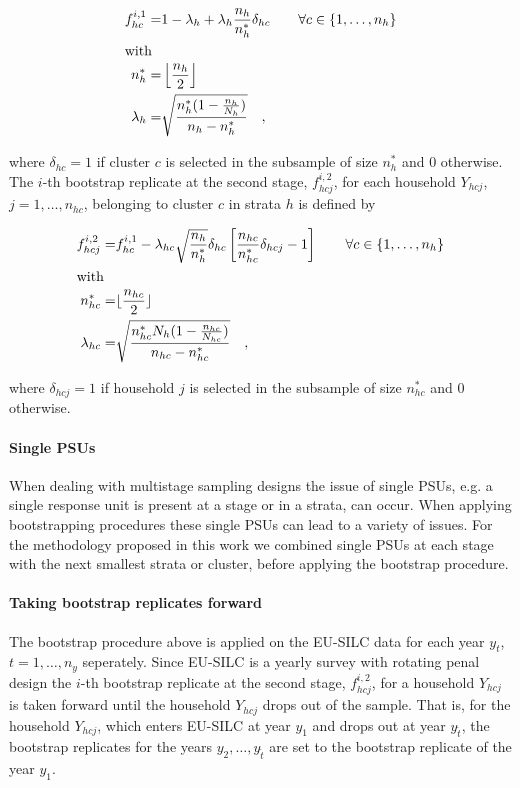 \documentclass{scrartcl}\usepackage[]{graphicx}\usepackage[]{color}
\begin{document}
\begin{align*}
  f^{i,1}_{hc} =& 1-\lambda_h+\lambda_h\frac{n_h}{n_h^*}\delta_{hc} \quad\quad \forall c \in \{1,\ldots,n_h\} \\
  \intertext{with}
  n_h^* =& \left\lfloor\frac{n_h}{2}\right\rfloor \\
  \lambda_h =& \sqrt{\frac{n_h^*(1-\frac{n_h}{N_h})}{n_h-n_h^*}} \quad ,
\end{align*}

where $\delta_{hc}=1$ if cluster $c$ is selected in the subsample of size $n_h^*$ and 0 otherwise.\\
\noindent
The $i$-th bootstrap replicate at the second stage, $f^{i,2}_{hcj}$, for each household $Y_{hcj}$, $j=1,\ldots,n_{hc}$, belonging to cluster $c$ in strata $h$ is defined by

\begin{align*}
  f^{i,2}_{hcj} =& f^{i,1}_{hc} - \lambda_{hc}\sqrt{\frac{n_h}{n_h^*}}\delta_{hc}\left[\frac{n_{hc}}{n_{hc}^*}\delta_{hcj}-1\right] \quad\quad \forall c \in \{1,\ldots,n_h\}\\
  \intertext{with}
  n_{hc}^* =& \lfloor\frac{n_{hc}}{2}\rfloor \\
  \lambda_{hc} =& \sqrt{\frac{n_{hc}^*N_h(1-\frac{n_{hc}}{N_{hc}})}{n_{hc}-n_{hc}^*}} \quad ,
\end{align*}

where $\delta_{hcj}=1$ if household $j$ is selected in the subsample of size $n_{hc}^*$ and 0 otherwise.\\

\paragraph{Single PSUs}
When dealing with multistage sampling designs the issue of single PSUs, e.g. a single response unit is present at a stage or in a strata, can occur. When applying bootstrapping procedures these single PSUs can lead to a variety of issues. For the methodology proposed in this work we combined single PSUs at each stage with the next smallest strata or cluster, before applying the bootstrap procedure.

\paragraph{Taking bootstrap replicates forward}
The bootstrap procedure above is applied on the EU-SILC data for each year $y_t$, $t=1,\ldots,n_y$ seperately. Since EU-SILC is a yearly survey with rotating penal design the $i$-th bootstrap replicate at the second stage, $f^{i,2}_{hcj}$, for a household $Y_{hcj}$ is taken forward until the household $Y_{hcj}$ drops out of the sample. That is, for the household $Y_{hcj}$, which enters EU-SILC at year $y_1$ and drops out at year $y_{\tilde{t}}$, the bootstrap replicates for the years $y_2,\ldots,y_{\tilde{t}}$ are set to the bootstrap replicate of the year $y_1$.
\end{document}

